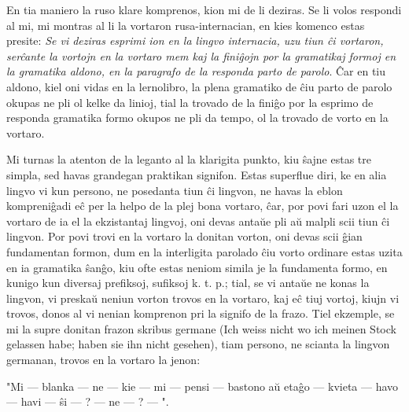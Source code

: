    En tia maniero la ruso klare komprenos, kion mi de li deziras. Se li
volos respondi al mi, mi montras al li la vortaron rusa-internacian,
en kies komenco estas presite: {\sl Se vi deziras esprimi ion en la
lingvo internacia, uzu tiun \^ci vortaron, ser\^cante la vortojn en
la vortaro mem kaj la fini\^gojn por la gramatikaj formoj en la
gramatika aldono, en la paragrafo de la responda parto de parolo}.
\^Car en tiu aldono, kiel oni vidas en la lernolibro, la plena
gramatiko de \^ciu parto de parolo okupas ne pli ol kelke da linioj,
tial la trovado de la fini\^go por la esprimo de responda gramatika
formo okupos ne pli da tempo, ol la trovado de vorto en la vortaro.

   Mi turnas la atenton de la leganto al la klarigita punkto, kiu
\^sajne estas tre simpla, sed havas grandegan praktikan signifon.
Estas superflue diri, ke en alia lingvo vi kun persono, ne posedanta
tiun \^ci lingvon, ne havas la eblon kompreni\^gadi e\^c per la
helpo de la plej bona vortaro, \^car, por povi fari uzon el la
vortaro de ia el la ekzistantaj lingvoj, oni devas anta\u ue pli a\u
u malpli scii tiun \^ci lingvon. Por povi trovi en la vortaro la
donitan vorton, oni devas scii \^gian fundamentan formon, dum en la
interligita parolado \^ciu vorto ordinare estas uzita en ia
gramatika \^san\^go, kiu ofte estas neniom simila je la fundamenta
formo, en kunigo kun diversaj prefiksoj, sufiksoj k. t. p.; tial, se
vi anta\u ue ne konas la lingvon, vi preska\u u neniun vorton trovos
en la vortaro, kaj e\^c tiuj vortoj, kiujn vi trovos, donos al vi
nenian komprenon pri la signifo de la frazo. Tiel ekzemple, se mi la
supre donitan frazon skribus germane (Ich weiss nicht wo ich meinen
Stock gelassen habe; haben sie ihn nicht gesehen), tiam persono, ne
scianta la lingvon germanan, trovos en la vortaro la jenon:

   "Mi --- blanka --- ne --- kie --- mi --- pensi --- bastono a\u u eta\^go
--- kvieta --- havo --- havi --- \^si --- ? --- ne --- ? --- ".

